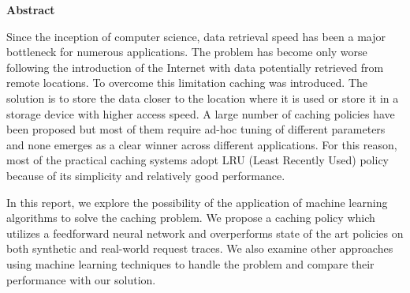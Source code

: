 
\Large \textbf{Abstract}

\normalsize
Since the inception of computer science, data retrieval speed has been a major bottleneck for numerous applications. The problem has become only worse following the introduction of the Internet with data potentially retrieved from remote locations. To overcome this limitation caching was introduced. The solution is to store the data closer to the location where it is used or store it in a storage device with higher access speed. A large number of caching policies have been proposed but most of them require ad-hoc tuning of different parameters and none emerges as a clear winner across different applications. For this reason, most of the practical caching systems adopt LRU (Least Recently Used) policy because of its simplicity and relatively good performance.

In this report, we explore the possibility of the application of machine learning algorithms to solve the caching problem. We propose a caching policy which utilizes a feedforward neural network and overperforms state of the art policies on both synthetic and real-world request traces. We also examine other approaches using machine learning techniques to handle the problem and compare their performance with our solution.
